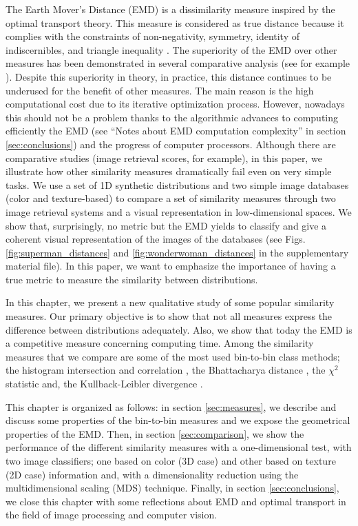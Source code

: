 The Earth Mover's Distance (EMD) \citep{Rubner.Tomasi.ea:IJCV:2000} is a dissimilarity measure inspired by the optimal transport theory. This measure is considered as true distance because it complies with the constraints of non-negativity, symmetry, identity of indiscernibles, and triangle inequality \citep{Peyre.Cuturi:arXiv:2018}. The superiority of the EMD over other measures has been demonstrated in several comparative analysis (see for example \citep{Puzicha.Buhmann.ea:ICCV:1999, Rubner.Tomasi.ea:IJCV:2000}). Despite this superiority in theory, in practice, this distance continues to be underused for the benefit of other measures. The main reason is the high computational cost due to its iterative optimization process. However, nowadays this should not be a problem thanks to the algorithmic advances to computing efficiently the EMD (see ``Notes about EMD computation complexity'' in section \ref{sec:conclusions}) and the progress of computer processors. Although there are comparative studies (image retrieval scores, for example), in this paper, we illustrate how other similarity measures dramatically fail even on very simple tasks. We use a set of 1D synthetic distributions and two simple image databases (color and texture-based) to compare a set of similarity measures through two image retrieval systems and a visual representation in low-dimensional spaces. We show that, surprisingly, no metric but the EMD yields to classify and give a coherent visual representation of the images of the databases (see Figs. \ref{fig:superman_distances} and \ref{fig:wonderwoman_distances} in the supplementary material file). In this paper, we want to emphasize the importance of having a true metric to measure the similarity between distributions.

In this chapter, we present a new qualitative study of some popular similarity measures. Our primary objective is to show that not all measures express the difference between distributions adequately. Also, we show that today the EMD is a competitive measure concerning computing time. Among the similarity measures that we compare are some of the most used bin-to-bin class methods; the histogram intersection and correlation \citep{Nejhum.Ho.ea:CVPR:2008}, the Bhattacharya distance \citep{So.Chung:JPR:2017}, the $\chi^2$ statistic and, the  Kullback-Leibler divergence \citep{Klein.Frintrop:CV:2011}. 

This chapter is organized as follows: in section \ref{sec:measures}, we describe and discuss some properties of the bin-to-bin measures and we expose the geometrical properties of the EMD. Then, in section \ref{sec:comparison}, we show the performance of the different similarity measures with a one-dimensional test, with two image classifiers; one based on color (3D case) and other based on texture (2D case) information and, with a dimensionality reduction using the multidimensional scaling (MDS) technique. Finally, in section \ref{sec:conclusions}, we close this chapter with some reflections about EMD and optimal transport in the field of image processing and computer vision.


